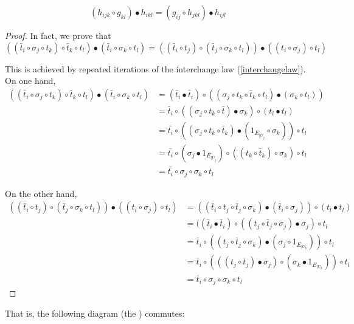 \begin{prop}
\begin{equation}\label{cococycle} (h_{ijk}\circ g_{kl})\bullet h_{ikl} = (g_{ij}\circ h_{jkl})\bullet h_{ijl}\end{equation} 
\end{prop}
\begin{proof}
In fact, we prove that
\[ ((\bar{t}_i\circ\sigma_j \circ t_k)\circ \bar{t}_k\circ t_l)\bullet (\bar{t}_i\circ \sigma_k\circ t_l) = ((\bar{t}_i\circ t_j) \circ (\bar{t}_j\circ \sigma_k\circ t_l))\bullet ((t_i\circ \sigma_j)\circ t_l)
\]

This is achieved by repeated iterations of the interchange law (\ref{interchangelaw}). On one hand,
\begin{align*}
((\bar{t}_i\circ\sigma_j \circ t_k)\circ \bar{t}_k\circ t_l)\bullet (\bar{t}_i\circ \sigma_k\circ t_l)&=(\bar{t}_i\bullet \bar{t}_i)\circ ((\sigma_j\circ t_k\circ\bar{t}_k\circ t_l)\bullet (\sigma_k\circ t_l))\\
&= \bar{t}_i\circ ((\sigma_j \circ t_k \circ \bar{t})\bullet \sigma_k )\circ (t_l\bullet t_l)\\
&= \bar{t_i}\circ ((\sigma_j\circ t_k\circ \bar{t}_k)\bullet (1_{E_{|U_j}}\circ \sigma_k))\circ t_l\\
&= \bar{t_i}\circ (\sigma_j\bullet 1_{E_{|U_j}})\circ ((t_k\circ \bar{t}_k)\circ \sigma_k)  \circ t_l\\
&= \bar{t_i}\circ \sigma_j \circ \sigma_k \circ t_l
\end{align*}

On the other hand,
\begin{align*}
((\bar{t}_i\circ t_j) \circ (\bar{t}_j\circ \sigma_k\circ t_l))\bullet ((t_i\circ \sigma_j)\circ t_l) &= ((\bar{t}_i\circ t_j\circ \bar{t}_j\circ \sigma_k)\bullet (\bar{t}_i\circ \sigma_j))\circ (t_l\bullet t_l)\\
&= ((\bar{t}_i\bullet \bar{t}_i)\circ ((t_j\circ \bar{t}_j \circ \sigma_j )\bullet \sigma_j )\circ t_l\\
&= \bar{t}_i \circ ((t_j\circ \bar{t}_j\circ \sigma_k)\bullet (\sigma_j \circ 1_{E_{|U_k}}))\circ t_l \\
&= \bar{t}_i \circ (((t_j\circ \bar{t}_j)\bullet \sigma_j)\circ (\sigma_k \bullet 1_{E_{|U_k}} ))\circ t_l \\
&= \bar{t}_i \circ \sigma_j \circ \sigma_k \circ t_l 
\end{align*}
\end{proof}


That is, the following diagram (the ) commutes:

